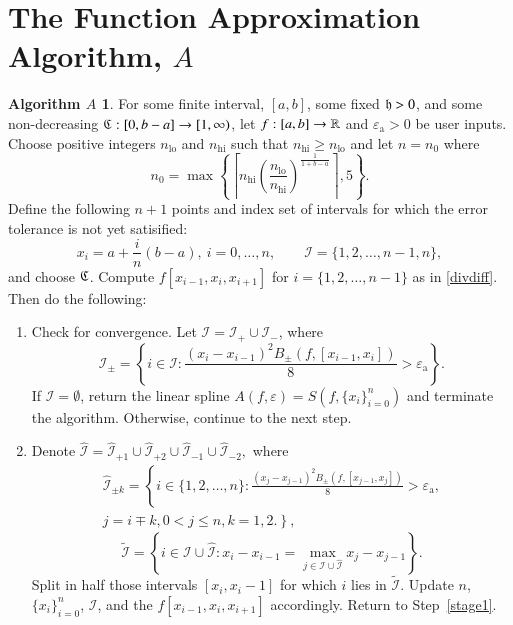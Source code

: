 \documentclass[review]{elsarticle}
\newcommand{\abstol}{\varepsilon_{\textrm{a}}}
\theoremstyle{definition}
\newtheorem*{algoA}{Algorithm $A$}
\DeclareMathOperator{\lo}{lo}
\begin{document}
\section{The Function Approximation Algorithm, $A$}\label{sec:fappx}

\begin{algoA}
For some finite interval, $[a,b]$, some fixed $\mathfrak{h} >0$, and some non-decreasing
$\mathfrak{C}:[0,b-a] \to [1, \infty)$, let $f:[a,b] \to \mathbb{R}$ and $\abstol >0$ be
user inputs. Choose positive integers $n_{\lo}$ and $n_{\text{hi}}$ such that 
$n_{\text{hi}} \ge n_{\lo}$ and let $n=n_0$ where
\begin{equation}
\label{nodefinition}
n_0 = \max\left\{\left\lceil n_{\text{hi}}
\left(\frac{n_{\lo}}{n_{\text{hi}}}\right)^{\frac{1}{1+b-a}}\right\rceil ,5\right\}.
\end{equation}
Define the
following $n+1$ points and index set of intervals for which the error tolerance
is not yet satisified: $$x_i=a+\frac{i}{n}(b-a), \ i=0,\ldots,n, \qquad
\mathcal{I} = \{1,2,\ldots,n-1,n\},$$ and choose $\mathfrak{C}$. Compute $f[x_{i-1},
x_{i}, x_{i+1}]$ for $i = \{1,2,\ldots,n-1\}$ as in \eqref{divdiff}. Then do the
following:
\begin{enumerate}[\hspace{8.5ex}]
\renewcommand{\labelenumi}{\textbf{Step \arabic{enumi}.}}
\item \label{stage1} Check for convergence.
Let $\mathcal{I}=\mathcal{I}_+ \cup \mathcal{I}_-$, where
\[
\mathcal{I}_\pm = \left\{i \in \mathcal{I}: \frac{(x_i - x_{i-1})^2B_\pm(f,[x_{i-1},x_i])}{8}  > \abstol \right\}.
\]
If $\mathcal{I} = \emptyset$, return the linear spline $A(f,\varepsilon) = S(f, \{x_i\}_{i=0}^n)$ and terminate the algorithm.
Otherwise, continue to the next step.
\item \label{stage2}
Denote $\widehat{\mathcal{I}}=\widehat{\mathcal{I}}_{+1} \cup \widehat{\mathcal{I}}_{+2} \cup \widehat{\mathcal{I}}_{-1} \cup \widehat{\mathcal{I}}_{-2},$ where
\begin{multline*}
\widehat{\mathcal{I}}_{\pm k} = \left\{i \in \{1,2,\ldots,n\}: \frac{(x_j - x_{j-1})^2B_\pm(f,[x_{j-1},x_j])}{8}  > \abstol,\right.\\
 \left.j=i\mp k, 0<j\le n, k=1,2. \right\},
\end{multline*}
\[\widetilde{\mathcal{I}}=\left\{i \in \mathcal{I} \cup \widehat{\mathcal{I}}: x_i - x_{i-1}=\max\limits_{j \in \mathcal{I} \cup \widehat{\mathcal{I}} } x_j-x_{j-1} \right\}.\]
Split in half those intervals $[x_i,x_i-1]$ for which $i$ lies in $\widetilde{\mathcal{I}}$.
Update $n$, $\{x_i\}_{i=0}^n$, $\mathcal{I}$, and the $f[x_{i-1}, x_{i}, x_{i+1}]$ accordingly.  Return to Step~\ref{stage1}.
\end{enumerate}
\end{algoA}
\end{document}
